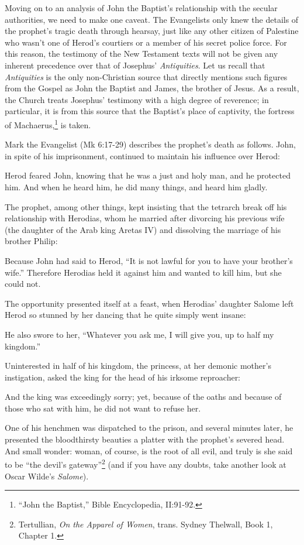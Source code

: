 Moving on to an analysis of John the Baptist's relationship with the secular authorities, we need to make one caveat. The Evangelists only knew the details of the prophet's tragic death through hearsay, just like any other citizen of Palestine who wasn't one of Herod's courtiers or a member of his secret police force. For this reason, the testimony of the New Testament texts will not be given any inherent precedence over that of Josephus' \emph{Antiquities}. Let us recall that \emph {Antiquities} is the only non-Christian source that directly mentions such figures from the Gospel as John the Baptist and James, the brother of Jesus. As a result, the Church treats Josephus' testimony with a high degree of reverence; in particular, it is from this source that the Baptist's place of captivity, the fortress of Machaerus,\footnote{``John the Baptist,'' Bible Encyclopedia, II:91-92.} is taken.

Mark the Evangelist (Mk 6:17-29) describes the prophet's death as follows. John, in spite of his imprisonment, continued to maintain his influence over Herod:

\begin{smallquote}
    Herod feared John, knowing that he was a just and holy man, and he protected him. And when he heard him, he did many things, and heard him gladly.
\end{smallquote}
The prophet, among other things, kept insisting that the tetrarch break off his relationship with Herodias, whom he married after divorcing his previous wife (the daughter of the Arab king Aretas IV) and dissolving the marriage of his brother Philip:
\begin{smallquote}
    Because John had said to Herod, ``It is not lawful for you to have your brother's wife.'' Therefore Herodias held it against him and wanted to kill him, but she could not.
\end{smallquote}

The opportunity presented itself at a feast, when Herodias' daughter Salome left Herod so stunned by her dancing that he quite simply went insane:

\begin{smallquote}
    He also swore to her, ``Whatever you ask me, I will give you, up to half my kingdom.''
\end{smallquote}
Uninterested in half of his kingdom, the princess, at her demonic mother's instigation, asked the king for the head of his irksome reproacher:

\begin{smallquote}
    And the king was exceedingly sorry; yet, because of the oaths and because of those who sat with him, he did not want to refuse her.
\end{smallquote}
One of his henchmen was dispatched to the prison, and several minutes later, he presented the bloodthirsty beauties a platter with the prophet's severed head. And small wonder: woman, of course, is the root of all evil, and truly is she said to be ``the devil's gateway''\footnote{Tertullian, \emph{On the Apparel of Women}, trans. Sydney Thelwall, Book 1, Chapter 1.} (and if you have any doubts, take another look at Oscar Wilde's \emph{Salome}).

